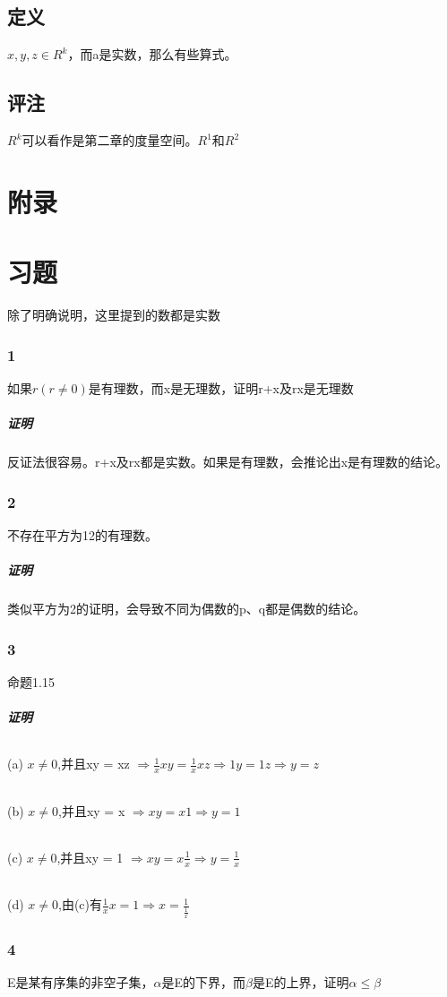 \section{定义} $ x,y,z \in R^k $，而a是实数，那么有些算式。
\section{评注} $ R^k $可以看作是第二章的度量空间。$ R^1 $和$ R^2 $
\subparagraph*{}
\chapter*{附录}
\subparagraph*{}
\chapter*{习题}除了明确说明，这里提到的数都是实数
\subsection*{1}如果$ r(r \ne 0) $是有理数，而x是无理数，证明r+x及rx是无理数
\paragraph{证明}反证法很容易。r+x及rx都是实数。如果是有理数，会推论出x是有理数的结论。
\subsection*{2} 不存在平方为12的有理数。
\paragraph{证明}类似平方为2的证明，会导致不同为偶数的p、q都是偶数的结论。
\subsection*{3} 命题1.15
\paragraph{证明}
\subparagraph{} (a) $x\ne 0$,并且xy = xz $ \Rightarrow \frac{1}{x}xy=\frac{1}{x}xz \Rightarrow 1y=1z \Rightarrow y=z$
\subparagraph{} (b) $x\ne 0$,并且xy = x $ \Rightarrow xy = x1 \Rightarrow y = 1 $
\subparagraph{} (c) $x\ne 0$,并且xy = 1 $ \Rightarrow xy = x\frac{1}{x} \Rightarrow y = \frac{1}{x} $
\subparagraph{} (d) $x\ne 0$,由(c)有$\frac{1}{x}x=1 \Rightarrow x=\frac{1}{\frac{1}{x}}$
\subsection*{4} E是某有序集的非空子集，$\alpha$是E的下界，而$\beta$是E的上界，证明$\alpha \le \beta$

